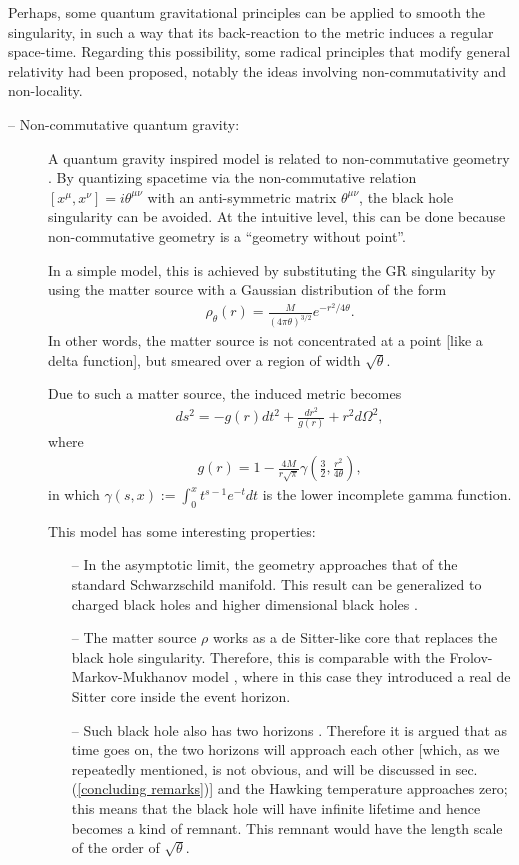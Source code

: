 \documentclass[12pt]{article}
\newcommand{\2}{$^2$}
\newcommand{\3}{$^3$}
\newcommand{\4}{$_4$}
\newcommand{\5}{$_5$}
\begin{document}
Perhaps, some quantum gravitational principles can be applied to smooth the singularity, in such a way that its back-reaction to the metric induces a regular space-time. Regarding this possibility, some radical principles that modify general relativity had been proposed, notably the ideas involving non-commutativity and non-locality.
\begin{description}
\item[-- Non-commutative quantum gravity:] A quantum gravity inspired model is related to non-commutative geometry \cite{Nicolini:2005vd,PN}. By quantizing spacetime via the non-commutative relation $[x^{\mu},x^{\nu}] = i \theta^{\mu\nu}$ with an anti-symmetric matrix $\theta^{\mu\nu}$, the black hole singularity can be avoided. At the intuitive level, this can be done because non-commutative geometry is a ``geometry without point''.

In a simple model, this is achieved by substituting the GR singularity by using the matter source with a Gaussian distribution of the form 
\begin{eqnarray}
\rho_{\theta}(r) = \frac{M}{(4\pi \theta)^{3/2}} e^{-r^{2}/4\theta}. 
\end{eqnarray}
In other words, the matter source is not concentrated at a point [like a delta function], but smeared over a region of width $\sqrt{\theta}$. 

Due to such a matter source, the induced metric becomes
\begin{eqnarray}
ds^{2} = - g(r) dt^{2} + \frac{dr^{2}}{g(r)} + r^{2} d\Omega^{2},
\end{eqnarray}
where
\begin{eqnarray}
g(r) = 1- \frac{4M}{r\sqrt{\pi}} \gamma\left( \frac{3}{2}, \frac{r^{2}}{4\theta}\right),
\end{eqnarray}
in which $\gamma(s,x):=\int_0^x t^{s-1}e^{-t} dt$ is the lower incomplete gamma function.

This model has some interesting properties:
\begin{itemize}
\item[--] In the asymptotic limit, the geometry approaches that of the standard Schwarzschild manifold. This result can be generalized to charged black holes \cite{Ansoldi:2006vg} and higher dimensional black holes \cite{Spallucci:2009zz}.
\item[--] The matter source $\rho$ works as a de Sitter-like core that replaces the black hole singularity. Therefore, this is comparable with the Frolov-Markov-Mukhanov model \cite{Frolov:1988vj}, where in this case they introduced a real de Sitter core inside the event horizon. 
\item[--] Such black hole also has two horizons \cite{0611130,1204.0143}. Therefore it is argued that as time goes on, the two horizons will approach each other [which, as we repeatedly mentioned, is not obvious, and will be discussed in sec.(\ref{concluding remarks})] and the Hawking temperature approaches zero; this means that the black hole will have infinite lifetime and hence becomes a kind of remnant. This remnant would have the length scale of the order of $\sqrt{\theta}$.
\end{itemize}


\end{description}
\end{document}
